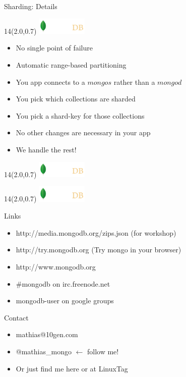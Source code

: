 \documentclass{beamer}
\newcommand{\MongoLogo}{
\begin{textblock}{14}(2.0,0.7)
  \includegraphics[height=0.8cm]{logo-mongodb-ondark.png}
\end{textblock}
}
\begin{document}
\begin{frame}[fragile]{Sharding: Details}
  \MongoLogo
  \begin{itemize}
    \item No single point of failure
    \item Automatic range-based partitioning
    \item You app connects to a $mongos$ rather than a $mongod$
    \item You pick which collections are sharded
    \item You pick a shard-key for those collections
    \item No other changes are necessary in your app
    \item We handle the rest!
  \end{itemize}
\end{frame}

\begin{frame}
  \MongoLogo
  \center
\end{frame}

\begin{frame}
  \MongoLogo


  \begin{block}{Links}
  \begin{itemize}
    \item http://media.mongodb.org/zips.json (for workshop)
    \item http://try.mongodb.org (Try mongo in your browser)
    \item http://www.mongodb.org
    \item \#mongodb on irc.freenode.net
    \item mongodb-user on google groups
  \end{itemize}
  \end{block}

  \begin{block}{Contact}
  \begin{itemize}
    \item mathias@10gen.com
    \item @mathias\_mongo ${\leftarrow}$ follow me!
    \item Or just find me here or at LinuxTag
  \end{itemize}
  \end{block}
\end{frame}
\end{document}

